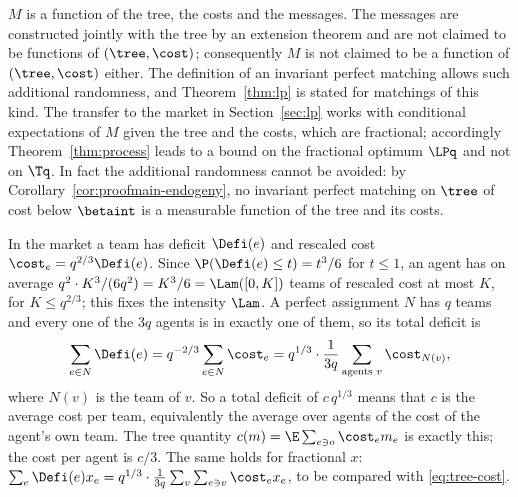 \begin{remark}\label{rem:tree-factor}
$M$ is a function of the tree, the costs and the messages. The messages are constructed
jointly with the tree by an extension theorem and are not claimed to be functions of
$(\tree,\cost)$; consequently $M$ is not claimed to be a function of $(\tree,\cost)$ either.
The definition of an invariant perfect matching allows such additional randomness, and
Theorem~\ref{thm:lp} is stated for matchings of this kind. The transfer to the market in
Section~\ref{sec:lp} works with conditional expectations of $M$ given the tree and the costs,
which are fractional; accordingly Theorem~\ref{thm:process} leads to a bound on the
fractional optimum $\LPq$ and not on $\Tq$. In fact the additional randomness cannot be
avoided: by Corollary~\ref{cor:proofmain-endogeny}, no invariant perfect matching on $\tree$
of cost below $\betaint$ is a measurable function of the tree and its costs.
\end{remark}

\begin{remark}[normalisation]\label{rem:tree-normalisation}
In the market a team has deficit $\Defi(e)$ and rescaled cost $\cost_e=q^{2/3}\Defi(e)$. Since
$\P(\Defi(e)\le t)=t^3/6$ for $t\le1$, an agent has on average
$q^2\cdot K^3/(6q^2)=K^3/6=\Lam([0,K])$ teams of rescaled cost at most $K$, for
$K\le q^{2/3}$; this fixes the intensity $\Lam$. A perfect assignment $N$ has $q$ teams and
every one of the $3q$ agents is in exactly one of them, so its total deficit is
\[
  \sum_{e\in N}\Defi(e)=q^{-2/3}\sum_{e\in N}\cost_e
  =q^{1/3}\cdot\frac{1}{3q}\sum_{\text{agents }v}\cost_{N(v)},
\]
where $N(v)$ is the team of $v$. So a total deficit of $c\,q^{1/3}$ means that $c$ is the
average cost per team, equivalently the average over agents of the cost of the agent's own
team. The tree quantity $c(m)=\E\sum_{e\ni o}\cost_e m_e$ is exactly this; the cost per agent
is $c/3$. The same holds for fractional $x$:
$\sum_e\Defi(e)x_e=q^{1/3}\cdot\frac{1}{3q}\sum_v\sum_{e\ni v}\cost_e x_e$, to be compared with
\eqref{eq:tree-cost}.
\end{remark}
